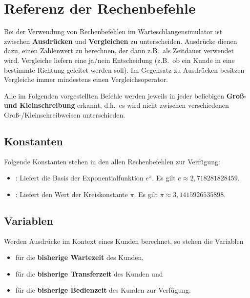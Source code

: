 \part{Referenz der Rechenbefehle}\label{part:Rechenbefehle}

Bei der Verwendung von Rechenbefehlen im Warteschlangensimulator ist zwischen
\textbf{Ausdrücken} und \textbf{Vergleichen} zu unterscheiden. Ausdrücke dienen
dazu, einen Zahlenwert zu berechnen, der dann z.B.\ als Zeitdauer verwendet wird.
Vergleiche liefern eine ja/nein Entscheidung (z.B.\ ob ein Kunde in eine bestimmte
Richtung geleitet werden soll). Im Gegensatz zu Ausdrücken besitzen Vergleiche immer
mindestens einen Vergleichsoperator.

Alle im Folgenden vorgestellten Befehle werden jeweils in jeder beliebigen
\textbf{Groß- und Kleinschreibung} erkannt, d.h.\ es wird nicht zwischen
verschiedenen Groß-/Kleinschreibweisen unterschieden.



\chapter{Konstanten}

Folgende Konstanten stehen in den allen Rechenbefehlen zur Verfügung:

\begin{itemize}

\item
{}: Liefert die Basis der Exponentialfunktion $e^x$. Es gilt
$e\approx 2,718281828459$.

\item
{}: Liefert den Wert der Kreiskonstante $\pi$. Es gilt
$\pi\approx 3,1415926535898$.

\end{itemize}



\chapter{Variablen}

Werden Ausdrücke im Kontext eines Kunden berechnet, so stehen die Variablen
\begin{itemize}
\item
{} für die \textbf{bisherige Wartezeit} des Kunden,
\item
{} für die \textbf{bisherige Transferzeit} des Kunden und
\item
{} für die \textbf{bisherige Bedienzeit} des Kunden zur Verfügung.
\end{itemize}

